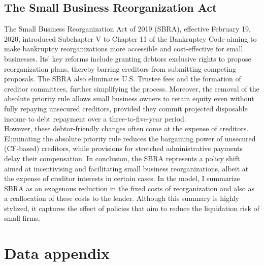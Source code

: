 \documentclass[12pt]{article}
\begin{document}
\subsection{The Small Business Reorganization Act \label{sec:A2}}

The Small Business Reorganization Act of 2019 (SBRA), effective February 19, 2020, introduced Subchapter V to Chapter 11 of the Bankruptcy Code aiming to make bankruptcy reorganizations more accessible and cost-effective for small businesses. Its' key reforms include granting debtors exclusive rights to propose reorganization plans, thereby barring creditors from submitting competing proposals. The SBRA also eliminates U.S. Trustee fees and the formation of creditor committees, further simplifying the process. Moreover, the removal of the absolute priority rule allows small business owners to retain equity even without fully repaying unsecured creditors, provided they commit projected disposable income to debt repayment over a three-to-five-year period. \vspace{3mm} \\
However, these debtor-friendly changes often come at the expense of creditors.  Eliminating the absolute priority rule reduces the bargaining power of unsecured (CF-based) creditors, while provisions for stretched administrative payments delay their compensation. In conclusion, the SBRA represents a policy shift aimed at incentivising and facilitating small business reorganizations, albeit at the expense of creditor interests in certain cases. In the model, I summarize SBRA as an exogenous reduction in the fixed costs of reorganization and also as a reallocation of these costs to the lender. Although this summary is highly stylized, it captures the effect of policies that aim to reduce the liquidation risk of small firms. 

\section{Data appendix \label{sec:A3}}
\end{document}

